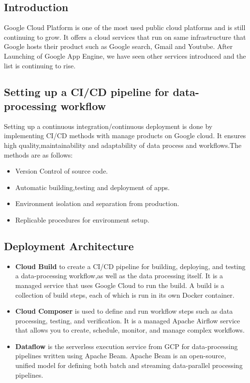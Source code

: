 \subsection{Introduction}
%
Google Cloud Platform is one of the most used public cloud platforms and is still continuing to grow. It offers a cloud services that run on same infrastructure that Google hosts their product such as Google search, Gmail and Youtube. After Launching of Google App Engine, we have seen other services introduced and the list is continuing to rise.
%
%


\subsection{Setting up a CI/CD pipeline for data-processing workflow}
%
Setting up a continuous integration/continuous deployment is done by implementing CI/CD methods with manage products on Google cloud. It ensures high quality,maintainability and adaptability of data process and workflows.The methods are as follows:
\begin{itemize}
    \item Version Control of source code.
    \item Automatic building,testing and deployment of apps.
    \item Environment isolation and separation from production.
    \item Replicable procedures for environment setup.
\end{itemize}
%
\subsection{Deployment Architecture}
%
\begin{itemize}
    \item  \textbf{Cloud Build} to create a CI/CD pipeline for building, deploying, and testing a data-processing workflow,as well as the data processing itself. It is a managed service that uses Google Cloud to run the build. A build is a collection of build steps, each of which is run in its own Docker container.
    \item \textbf{Cloud Composer} is used to define and run workflow steps such as data processing, testing, and verification. It is a managed Apache Airflow service that allows you to create, schedule, monitor, and manage complex workflows.
    \item \textbf{Dataflow} is the serverless execution service from GCP for data-processing pipelines written using Apache Beam. Apache Beam is an open-source, unified model for defining both batch and streaming data-parallel processing pipelines.
\end{itemize}

